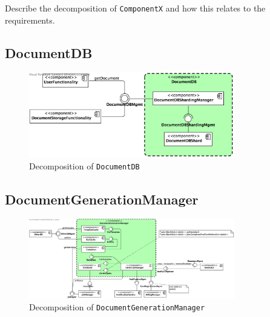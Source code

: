 \documentclass[a4paper,10pt]{article}
\begin{document}
Describe the decomposition of \texttt{ComponentX} and how this relates to the
requirements.

\subsection{DocumentDB}\label{subsec:decomp-DocumentDB}
\begin{figure}[!htp]
	\centering
	\includegraphics[width=0.8\textwidth]{DocumentDB.png}
	\caption{Decomposition of \texttt{DocumentDB}}
	\label{fig:decomp-DocumentDB}
\end{figure}
\FloatBarrier

\subsection{DocumentGenerationManager}\label{subsec:decomp-DocumentGenerationManager}
\begin{figure}[!htp]
	\centering
	\includegraphics[width=0.8\textwidth]{DocumentGenerationManager.png}
	\caption{Decomposition of \texttt{DocumentGenerationManager}}
	\label{fig:decomp-DocumentGenerationManager}
\end{figure}
\FloatBarrier
\end{document}
